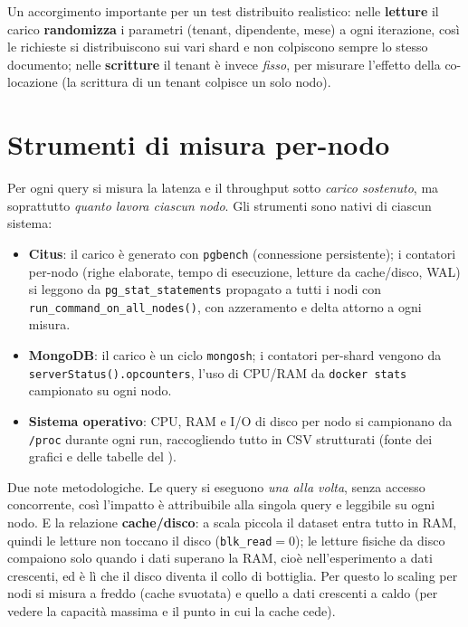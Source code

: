 Un accorgimento importante per un test distribuito realistico: nelle \textbf{letture} il carico
\textbf{randomizza} i parametri (tenant, dipendente, mese) a ogni iterazione, così le richieste si distribuiscono
sui vari shard e non colpiscono sempre lo stesso documento; nelle \textbf{scritture} il tenant è invece
\emph{fisso}, per misurare l'effetto della co-locazione (la scrittura di un tenant colpisce un solo nodo).

\section{Strumenti di misura per-nodo}
\label{sec:misura}

Per ogni query si misura la latenza e il throughput sotto \emph{carico sostenuto}, ma soprattutto
\emph{quanto lavora ciascun nodo}. Gli strumenti sono nativi di ciascun sistema:
\begin{itemize}
  \item \textbf{Citus}: il carico è generato con \texttt{pgbench} (connessione persistente); i contatori
        per-nodo (righe elaborate, tempo di esecuzione, letture da cache/disco, WAL) si leggono da
        \texttt{pg\_stat\_statements} propagato a tutti i nodi con \texttt{run\_command\_on\_all\_nodes()},
        con azzeramento e delta attorno a ogni misura.
  \item \textbf{MongoDB}: il carico è un ciclo \texttt{mongosh}; i contatori per-shard vengono da
        \texttt{serverStatus().opcounters}, l'uso di CPU/RAM da \texttt{docker stats} campionato su ogni nodo.
  \item \textbf{Sistema operativo}: CPU, RAM e I/O di disco per nodo si campionano da \texttt{/proc} durante
        ogni run, raccogliendo tutto in CSV strutturati (fonte dei grafici e delle tabelle del
        ).
\end{itemize}

Due note metodologiche. Le query si eseguono \emph{una alla volta}, senza accesso concorrente, così l'impatto
è attribuibile alla singola query e leggibile su ogni nodo. E la relazione \textbf{cache/disco}: a scala
piccola il dataset entra tutto in RAM, quindi le letture non toccano il disco (\texttt{blk\_read}${=}0$); le
letture fisiche da disco compaiono solo quando i dati superano la RAM, cioè nell'esperimento a dati crescenti,
ed è lì che il disco diventa il collo di bottiglia. Per questo lo scaling per nodi si misura a freddo (cache
svuotata) e quello a dati crescenti a caldo (per vedere la capacità massima e il punto in cui la cache cede).
